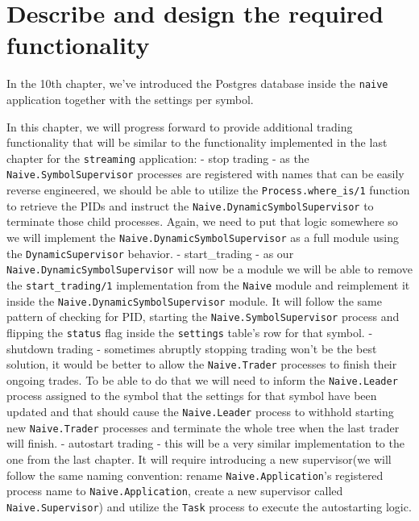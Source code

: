 \documentclass[
  oneside]{book}
\begin{document}
\hypertarget{describe-and-design-the-required-functionality-3}{%
\section{Describe and design the required functionality}\label{describe-and-design-the-required-functionality-3}}

In the 10th chapter, we've introduced the Postgres database inside the \texttt{naive} application together with the settings per symbol.

In this chapter, we will progress forward to provide additional trading functionality that will be similar to the functionality implemented in the last chapter for the \texttt{streaming} application:
- stop trading - as the \texttt{Naive.SymbolSupervisor} processes are registered with names that can be easily reverse engineered, we should be able to utilize the \texttt{Process.where\_is/1} function to retrieve the PIDs and instruct the \texttt{Naive.DynamicSymbolSupervisor} to terminate those child processes. Again, we need to put that logic somewhere so we will implement the \texttt{Naive.DynamicSymbolSupervisor} as a full module using the \texttt{DynamicSupervisor} behavior.
- start\_trading - as our \texttt{Naive.DynamicSymbolSupervisor} will now be a module we will be able to remove the \texttt{start\_trading/1} implementation from the \texttt{Naive} module and reimplement it inside the \texttt{Naive.DynamicSymbolSupervisor} module. It will follow the same pattern of checking for PID, starting the \texttt{Naive.SymbolSupervisor} process and flipping the \texttt{status} flag inside the \texttt{settings} table's row for that symbol.
- shutdown trading - sometimes abruptly stopping trading won't be the best solution, it would be better to allow the \texttt{Naive.Trader} processes to finish their ongoing trades. To be able to do that we will need to inform the \texttt{Naive.Leader} process assigned to the symbol that the settings for that symbol have been updated and that should cause the \texttt{Naive.Leader} process to withhold starting new \texttt{Naive.Trader} processes and terminate the whole tree when the last trader will finish.
- autostart trading - this will be a very similar implementation to the one from the last chapter. It will require introducing a new supervisor(we will follow the same naming convention: rename \texttt{Naive.Application}'s registered process name to \texttt{Naive.Application}, create a new supervisor called \texttt{Naive.Supervisor}) and utilize the \texttt{Task} process to execute the autostarting logic.
\end{document}
